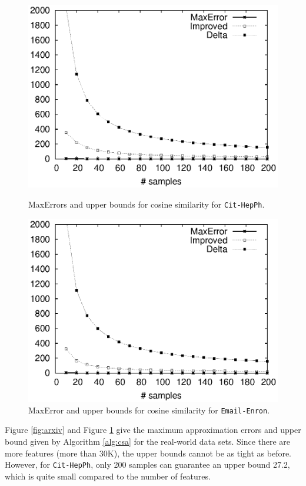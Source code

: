 \documentclass{article}
\begin{document}
\begin{figure}[!t]
\centering
\begin{minipage}{.45\textwidth}
\centering
\includegraphics[width=.9\textwidth]{cos_arxiv_apprx_error.eps}
\caption{\textsf{MaxError}s and upper bounds for cosine similarity for \texttt{Cit-HepPh}.}
\label{fig:arxiv}
\end{minipage}
\hspace{1cm}
\begin{minipage}{.45\textwidth}
\centering
\includegraphics[width=.9\textwidth]{cos_email_apprx_error.eps}
\caption{\textsf{MaxError} and upper bounds for cosine similarity for \texttt{Email-Enron}.}
\label{fig:email}
\end{minipage}
\end{figure}

Figure \ref{fig:arxiv} and Figure \ref{fig:email} give the maximum approximation errors and upper bound given by Algorithm \ref{alg:csa} for the real-world data sets. Since there are more features (more than 30K), the upper bounds cannot be as tight as before. However, for \texttt{Cit-HepPh}, only 200 samples can guarantee an upper bound 27.2, which is quite small compared to the number of features.
\end{document}
